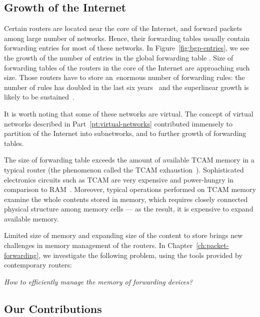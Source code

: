 \subsection{Growth of the Internet}

Certain routers are located near the core of the Internet, and forward packets among large number of networks.
Hence, their forwarding tables usually contain forwarding entries for most of these networks.
In Figure~\ref{fig:bgp-entries}, we see the growth of the number of entries in the global forwarding table \cite{url-bgp-entries}.
Size of forwarding tables of the routers in the core of the Internet are approaching such size.
Those routers have to store an~enormous number of forwarding rules: the
number of rules has doubled in the last six years~\cite{bgp-routeviews} and
the superlinear growth is likely to be sustained~\cite{steve-myth}.

It is worth noting that some of these networks are virtual.
The concept of virtual networks described in Part~\ref{pt:virtual-networks} contributed immensely to partition of the Internet into subnetworks, and to further growth of forwarding tables.

The size of forwarding table exceeds the amount of available TCAM memory in a typical router (the phenomenon called the TCAM exhaustion~\cite{tcam-exhaust}).
Sophisticated electronics circuits such as TCAM are very expensive and power-hungry in comparison to RAM~\cite{tcam-expensive}.
Moreover, typical operations performed on TCAM memory examine the whole contents stored in memory, which requires closely connected physical structure among memory cells --- as the result, it is expensive to expand available memory.

Limited size of memory and expanding size of the content to store brings new challenges in memory management of the routers.
In Chapter~\ref{ch:packet-forwarding}, we investigate the following problem, using the tools provided by contemporary routers:
\begin{center}
  \emph{How to efficiently manage the memory of forwarding devices?}
\end{center}

\subsection{Our Contributions}


